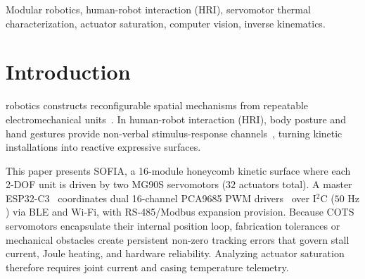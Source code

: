 \documentclass[lettersize,journal]{IEEEtran}
\begin{document}
	\begin{IEEEkeywords}
		Modular robotics, human-robot interaction (HRI), servomotor thermal characterization, actuator saturation, computer vision, inverse kinematics.
	\end{IEEEkeywords}
	
	\section{Introduction}
	\label{sec:introduction}
	
	 robotics constructs reconfigurable spatial mechanisms from repeatable electromechanical units~\cite{seo2019modular}. In human-robot interaction (HRI), body posture and hand gestures provide non-verbal stimulus-response channels~\cite{fong2003social}, turning kinetic installations into reactive expressive surfaces.
	
	This paper presents SOFIA, a 16-module honeycomb kinetic surface where each 2-DOF unit is driven by two MG90S servomotors ($32$ actuators total). A master ESP32-C3~\cite{espressif2024esp32c3} coordinates dual 16-channel PCA9685 PWM drivers~\cite{nxp2015pca9685} over I$^2$C ($50\text{ Hz}$) via BLE and Wi-Fi, with RS-485/Modbus expansion provision. Because COTS servomotors encapsulate their internal position loop, fabrication tolerances or mechanical obstacles create persistent non-zero tracking errors that govern stall current, Joule heating, and hardware reliability. Analyzing actuator saturation~\cite{kirk2004optimal} therefore requires joint current and casing temperature telemetry.
	
\end{document}
